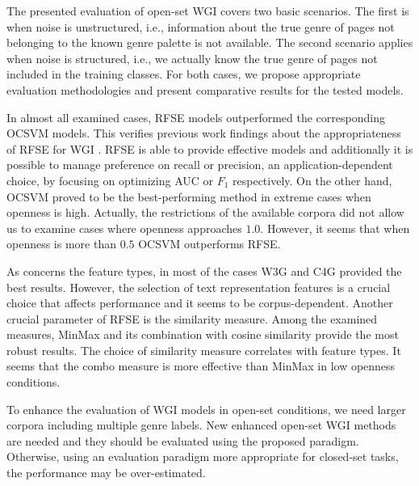 \documentclass[runningheads]{llncs}
\begin{document}
The presented evaluation of open-set WGI covers two basic scenarios. The first is when noise is unstructured, i.e., information about the true genre of pages not belonging to the known genre palette is not available. The second scenario applies when noise is structured, i.e., we actually know the true genre of pages not included in the training classes. For both cases, we propose appropriate evaluation methodologies and present comparative results for the tested models.

In almost all examined cases, RFSE models outperformed the corresponding OCSVM models. This verifies previous work findings about the appropriateness of RFSE for WGI \citep{pritsos2013open}. RFSE is able to provide effective models and additionally it is possible to manage preference on recall or precision, an application-dependent choice, by focusing on optimizing AUC or $F_1$ respectively. On the other hand, OCSVM proved to be the best-performing method in extreme cases when openness is high. Actually, the restrictions of the available corpora did not allow us to examine cases where openness approaches $1.0$. However, it seems that when openness is more than $0.5$ OCSVM outperforms RFSE.

As concerns the feature types, in most of the cases W3G and C4G provided the best results. However, the selection of text representation features is a crucial choice that affects performance and it seems to be corpus-dependent. Another crucial parameter of RFSE is the similarity measure. Among the examined measures, MinMax and its combination with cosine similarity provide the most robust results. The choice of similarity measure correlates with feature types. It seems that the combo measure is more effective than MinMax in low openness conditions.

To enhance the evaluation of WGI models in open-set conditions, we need larger corpora including multiple genre labels. New enhanced open-set WGI methods are needed and they should be evaluated using the proposed paradigm. Otherwise, using an evaluation paradigm more appropriate for closed-set tasks, the performance may be over-estimated.



\end{document}
